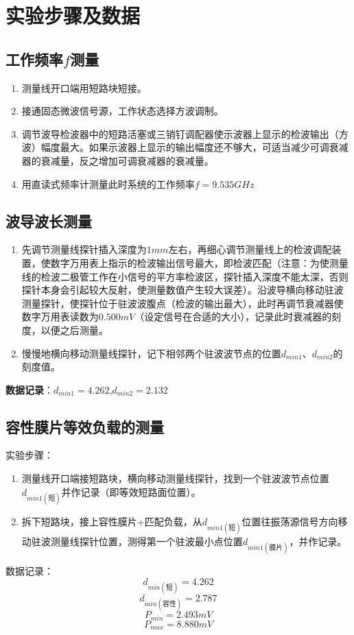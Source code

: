 \documentclass{../source/zjureport}
\begin{document}
    \section{实验步骤及数据}
        \subsection{工作频率$f$测量}
            \begin{enumerate}
                \item 测量线开口端用短路块短接。
                \item 接通固态微波信号源，工作状态选择方波调制。
                \item 调节波导检波器中的短路活塞或三销钉调配器使示波器上显示的检波输出（方波）幅度最大。如果示波器上显示的输出幅度还不够大，可适当减少可调衰减器的衰减量，反之增加可调衰减器的衰减量。
                \item 用直读式频率计测量此时系统的工作频率$f = 9.535GHz$
            \end{enumerate}
        \subsection{波导波长测量}
            \begin{enumerate}
                \item 先调节测量线探针插入深度为$1mm$左右，再细心调节测量线上的检波调配装置，使数字万用表上指示的检波输出信号最大，即检波匹配（注意：为使测量线的检波二极管工作在小信号的平方率检波区，探针插入深度不能太深，否则探针本身会引起较大反射，使测量数值产生较大误差）。沿波导横向移动驻波测量探针，使探针位于驻波波腹点（检波的输出最大），此时再调节衰减器使数字万用表读数为$0.500mV$（设定信号在合适的大小），记录此时衰减器的刻度，以便之后测量。
                \item 慢慢地横向移动测量线探针，记下相邻两个驻波波节点的位置$d_{min1}、d_{min2}$的刻度值。
            \end{enumerate}

            {\bf 数据记录}：$d_{min1}= 4.262$,$d_{min2} = 2.132$

        \subsection{容性膜片等效负载的测量}
            实验步骤：
            \begin{enumerate}
                \item 测量线开口端接短路块，横向移动测量线探针，找到一个驻波波节点位置$d_{min1(\text{短})}$并作记录（即等效短路面位置）。
                \item 拆下短路块，接上容性膜片+匹配负载，从$d_{min1(\text{短})}$位置往振荡源信号方向移动驻波测量线探针位置，测得第一个驻波最小点位置$d_{min1(\text{膜片})}$，并作记录。
            \end{enumerate}
            数据记录：
            $$d_{min(\text{短})} = 4.262$$
            $$d_{min(\text{容性})} = 2.787$$
            $$P_{min} = 2.493mV$$
            $$P_{max} = 8.880mV$$
\end{document}
